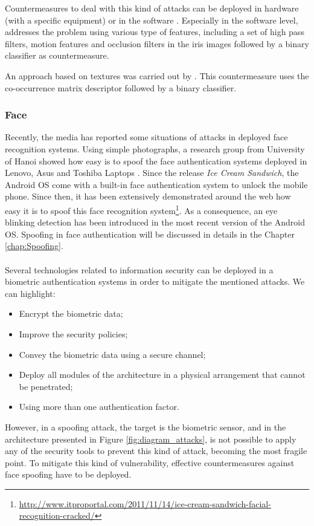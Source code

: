 Countermeasures to deal with this kind of attacks can be deployed in hardware (with a specific equipment) or in the software \cite{Galbally_ICB-2012}. Especially in the software level, \cite{Galbally_ICB-2012} addresses the problem using various type of features, including a set of  high pass filters, motion features and occlusion filters in the iris images followed by a binary classifier as countermeasure. 

An approach based on textures was carried out by \cite{ZhuoshiWei}. This countermeasure uses the co-occurrence matrix descriptor followed by a binary classifier.


\subsubsection{Face}

Recently, the media has reported some situations of attacks in deployed face recognition systems. Using simple photographs, a research group from University of Hanoi showed how easy is to spoof the face authentication systems deployed in Lenovo, Asus and Toshiba Laptops \cite{BlackHat2009}. Since the release \textit{Ice Cream Sandwich}, the Android OS come with a built-in face authentication system to unlock the mobile phone. Since then, it has been extensively demonstrated around the web how easy it is to spoof this face recognition system\footnote{\url{http://www.itproportal.com/2011/11/14/ice-cream-sandwich-facial-recognition-cracked/}}. As a consequence, an eye blinking detection has been introduced in the most recent version of the Android OS. Spoofing in face authentication will be discussed in details in the Chapter \ref{chap:Spoofing}. \\ \\ 

Several technologies related to information security can be deployed in a biometric authentication systems in order to mitigate the mentioned attacks. We can highlight:
\begin{itemize}
        \item Encrypt the biometric data;
        \item Improve the security policies;
        \item Convey the biometric data using a secure channel;
        \item Deploy all modules of the architecture in a physical arrangement that cannot be penetrated;
        \item Using more than one authentication factor.
\end{itemize}
However, in a spoofing attack, the target is the biometric sensor, and in the architecture presented in Figure \ref{fig:diagram_attacks}, is not possible to apply any of the security tools to prevent this kind of attack, becoming the most fragile point. To mitigate this kind of vulnerability, effective countermeasures against face spoofing have to be deployed.


